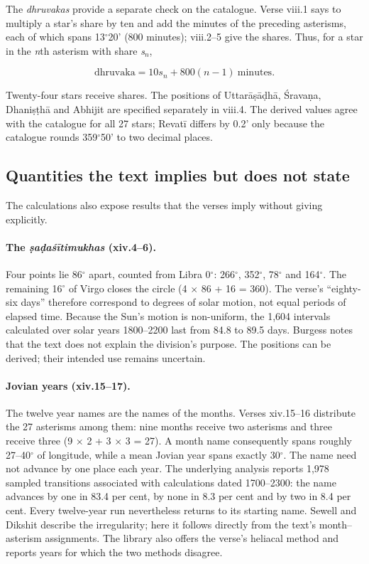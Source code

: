 \documentclass[11pt,a4paper]{article}
\begin{document}
The \textit{dhruvakas} provide a separate check on the catalogue. Verse viii.1 says to multiply a star's share by ten and add the minutes of the preceding asterisms, each of which spans 13$^\circ$20' (800 minutes); viii.2--5 give the shares. Thus, for a star in the \textit{n}th asterism with share \textit{s$_n$},

\[
\mathrm{dhruvaka}=10s_n+800(n-1)\ \mathrm{minutes}.
\]

Twenty-four stars receive shares. The positions of Uttar\={a}\d{s}\={a}\d{d}h\={a}, \'{S}rava\d{n}a, Dhani\d{s}\d{t}h\={a} and Abhijit are specified separately in viii.4. The derived values agree with the catalogue for all 27 stars; Revat\={i} differs by 0.2' only because the catalogue rounds 359$^\circ$50' to two decimal places.

\subsection{Quantities the text implies but does not state}
\label{sec:implicit}

The calculations also expose results that the verses imply without giving explicitly.

\paragraph{The \textit{\d{s}a\d{d}a\'{s}\={i}timukhas} (xiv.4--6).} Four points lie 86$^\circ$ apart, counted from Libra 0$^\circ$: 266$^\circ$, 352$^\circ$, 78$^\circ$ and 164$^\circ$. The remaining 16$^\circ$ of Virgo closes the circle (4 $\times$ 86 + 16 = 360). The verse's ``eighty-six days'' therefore correspond to degrees of solar motion, not equal periods of elapsed time. Because the Sun's motion is non-uniform, the 1,604 intervals calculated over solar years 1800--2200 last from 84.8 to 89.5 days. Burgess notes that the text does not explain the division's purpose. The positions can be derived; their intended use remains uncertain.

\paragraph{Jovian years (xiv.15--17).} The twelve year names are the names of the months. Verses xiv.15--16 distribute the 27 asterisms among them: nine months receive two asterisms and three receive three (9 $\times$ 2 + 3 $\times$ 3 = 27). A month name consequently spans roughly 27--40$^\circ$ of longitude, while a mean Jovian year spans exactly 30$^\circ$. The name need not advance by one place each year. The underlying analysis reports 1,978 sampled transitions associated with calculations dated 1700--2300: the name advances by one in 83.4 per cent, by none in 8.3 per cent and by two in 8.4 per cent. Every twelve-year run nevertheless returns to its starting name. Sewell and Dikshit \citep{sewell1896} describe the irregularity; here it follows directly from the text's month--asterism assignments. The library also offers the verse's heliacal method and reports years for which the two methods disagree.
\end{document}
